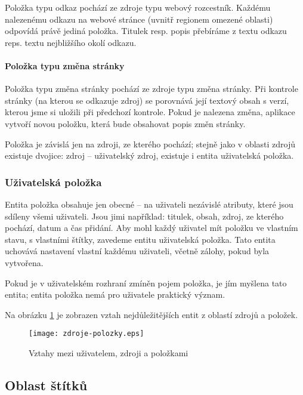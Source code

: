 Položka typu odkaz pochází ze zdroje typu webový rozcestník.
Každému nalezenému odkazu na webové stránce (uvnitř regionem omezené oblasti) odpovídá právě jediná položka.
Titulek resp. popis přebíráme z textu odkazu reps. textu nejbližšího okolí odkazu.

\paragraph{Položka typu změna stránky}

Položka typu změna stránky pochází ze zdroje typu změna stránky.
Při kontrole stránky (na kterou se odkazuje zdroj) se porovnává její textový obsah s verzí, kterou jsme si uložili při předchozí kontrole.
Pokud je nalezena změna, aplikace vytvoří novou položku, která bude obsahovat popis změn stránky.

\bigskip

Položka je závislá jen na zdroji, ze kterého pochází; stejně jako v oblasti zdrojů existuje dvojice: zdroj -- uživatelský zdroj, existuje i entita uživatelská položka.

\subsubsection{Uživatelská položka}

Entita položka obsahuje jen obecné -- na uživateli nezávislé atributy, které jsou sdíleny všemi uživateli.
Jsou jimi například: titulek, obsah, zdroj, ze kterého pochází, datum a čas přidání.
Aby mohl každý uživatel mít položku ve vlastním stavu, s vlastními štítky, zavedeme entitu uživatelská položka.
Tato entita uchovává nastavení vlastní každému uživateli, včetně zálohy, pokud byla vytvořena.

Pokud je v uživatelském rozhraní zmíněn pojem položka, je jím myšlena tato entita; entita položka nemá pro uživatele praktický význam.

\bigskip

Na obrázku \ref{fig:source-item} je zobrazen vztah nejdůležitějších entit z oblastí zdrojů a položek.

\begin{figure}
    \centering
    \texttt{[image: zdroje-polozky.eps]}
    \caption{Vztahy mezi uživatelem, zdroji a položkami}
    \label{fig:source-item}
\end{figure}

\subsection{Oblast štítků}

